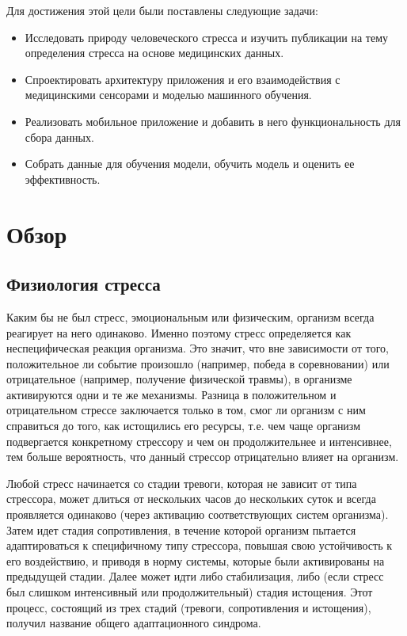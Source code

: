 \documentclass[14pt]{matmex-diploma-custom}
\begin{document}
Для достижения этой цели были поставлены следующие задачи:

\begin{itemize}
\item Исследовать природу человеческого стресса и изучить публикации на тему
  определения стресса на основе медицинских данных.
\item Спроектировать архитектуру приложения и его взаимодействия с медицинскими
  сенсорами и моделью машинного обучения.
\item Реализовать мобильное приложение и добавить в него функциональность для
  сбора данных.
\item Собрать данные для обучения модели, обучить модель и оценить ее
  эффективность.
\end{itemize}

\section{Обзор}
\subsection{Физиология стресса}
Каким бы не был стресс, эмоциональным или физическим, организм всегда реагирует
на него одинаково. Именно поэтому стресс определяется как неспецифическая
реакция организма. Это значит, что вне зависимости от того, положительное ли
событие произошло (например, победа в соревновании) или отрицательное (например,
получение физической травмы), в организме активируются одни и те же механизмы.
Разница в положительном и отрицательном стрессе заключается только в том, смог
ли организм с ним справиться до того, как истощились его ресурсы, т.е. чем чаще
организм подвергается конкретному стрессору и чем он продолжительнее и
интенсивнее, тем больше вероятность, что данный стрессор отрицательно влияет на
организм.

Любой стресс начинается со стадии тревоги, которая не зависит от типа стрессора,
может длиться от нескольких часов до нескольких суток и всегда проявляется
одинаково (через активацию соответствующих систем организма). Затем идет стадия
сопротивления, в течение которой организм пытается адаптироваться к специфичному
типу стрессора, повышая свою устойчивость к его воздействию, и приводя в норму
системы, которые были активированы на предыдущей стадии. Далее может идти либо
стабилизация, либо (если стресс был слишком интенсивный или продолжительный)
стадия истощения. Этот процесс, состоящий из трех стадий (тревоги, сопротивления
и истощения), получил название общего адаптационного синдрома.
\end{document}
